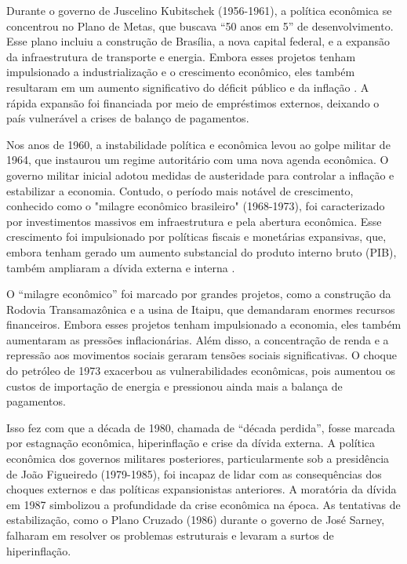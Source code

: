 \documentclass[12pt,oneside,a4paper,chapter=TITLE,english,brazil,sumario=abnt-6027-2012]{abntex2}
\begin{document}
Durante o governo de Juscelino Kubitschek (1956-1961), a política econômica se concentrou no Plano de Metas, que buscava ``50 anos em 5'' de desenvolvimento. Esse plano incluiu a construção de Brasília, a nova capital federal, e a expansão da infraestrutura de transporte e energia. Embora esses projetos tenham impulsionado a industrialização e o crescimento econômico, eles também resultaram em um aumento significativo do déficit público e da inflação \cite{bielschowsky_2022_a}. A rápida expansão foi financiada por meio de empréstimos externos, deixando o país vulnerável a crises de balanço de pagamentos.

Nos anos de 1960, a instabilidade política e econômica levou ao golpe militar de 1964, que instaurou um regime autoritário com uma nova agenda econômica. O governo militar inicial adotou medidas de austeridade para controlar a inflação e estabilizar a economia. Contudo, o período mais notável de crescimento, conhecido como o "milagre econômico brasileiro" (1968-1973), foi caracterizado por investimentos massivos em infraestrutura e pela abertura econômica. Esse crescimento foi impulsionado por políticas fiscais e monetárias expansivas, que, embora tenham gerado um aumento substancial do produto interno bruto (PIB), também ampliaram a dívida externa e interna \cite{amaurypatrickgremaud_2009_economia}.

O ``milagre econômico'' foi marcado por grandes projetos, como a construção da Rodovia Transamazônica e a usina de Itaipu, que demandaram enormes recursos financeiros. Embora esses projetos tenham impulsionado a economia, eles também aumentaram as pressões inflacionárias. Além disso, a concentração de renda e a repressão aos movimentos sociais geraram tensões sociais significativas. O choque do petróleo de 1973 exacerbou as vulnerabilidades econômicas, pois aumentou os custos de importação de energia e pressionou ainda mais a balança de pagamentos.

Isso fez com que a década de 1980, chamada de ``década perdida'', fosse marcada por estagnação econômica, hiperinflação e crise da dívida externa. A política econômica dos governos militares posteriores, particularmente sob a presidência de João Figueiredo (1979-1985), foi incapaz de lidar com as consequências dos choques externos e das políticas expansionistas anteriores. A moratória da dívida em 1987 simbolizou a profundidade da crise econômica \cite{fabiogiambiagi_2016_economia} na época. As tentativas de estabilização, como o Plano Cruzado (1986) durante o governo de José Sarney, falharam em resolver os problemas estruturais e levaram a surtos de hiperinflação.
\end{document}
